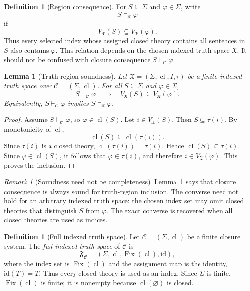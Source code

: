 \documentclass[11pt]{amsart}
\numberwithin{equation}{section}
\theoremstyle{plain}
\newtheorem{lemma}[theorem]{Lemma}
\theoremstyle{definition}
\newtheorem{definition}[theorem]{Definition}
\theoremstyle{remark}
\newtheorem{remark}[theorem]{Remark}
\newcommand{\Cl}{\operatorname{cl}}
\newcommand{\Fix}{\operatorname{Fix}}
\newcommand{\C}{\mathcal C}
\newcommand{\X}{\mathfrak X}
\newcommand{\F}{\mathfrak F}
\newcommand{\Sig}{\Sigma}
\begin{document}
\begin{definition}[Region consequence]
For \(S\subseteq\Sig\) and \(\varphi\in\Sig\), write
\[
  S\models_{\X}\varphi
\]
if
\[
  V_{\X}(S)\subseteq V_{\X}(\varphi).
\]
Thus every selected index whose assigned closed theory contains all sentences in \(S\) also contains \(\varphi\). This relation depends on the chosen indexed truth space \(\X\). It should not be confused with closure consequence \(S\vdash_{\C}\varphi\).
\end{definition}

\begin{lemma}[Truth-region soundness]
\label{lem:truth-region-soundness}
Let \(\X=(\Sig,\Cl,I,\tau)\) be a finite indexed truth space over \(\C=(\Sig,\Cl)\). For all \(S\subseteq\Sig\) and \(\varphi\in\Sig\),
\[
  S\vdash_{\C}\varphi
  \quad\Longrightarrow\quad
  V_{\X}(S)\subseteq V_{\X}(\varphi).
\]
Equivalently, \(S\vdash_{\C}\varphi\) implies \(S\models_{\X}\varphi\).
\end{lemma}

\begin{proof}
Assume \(S\vdash_{\C}\varphi\), so \(\varphi\in\Cl(S)\). Let \(i\in V_{\X}(S)\). Then \(S\subseteq\tau(i)\). By monotonicity of \(\Cl\),
\[
  \Cl(S)\subseteq\Cl(\tau(i)).
\]
Since \(\tau(i)\) is a closed theory, \(\Cl(\tau(i))=\tau(i)\). Hence \(\Cl(S)\subseteq\tau(i)\). Since \(\varphi\in\Cl(S)\), it follows that \(\varphi\in\tau(i)\), and therefore \(i\in V_{\X}(\varphi)\). This proves the inclusion.
\end{proof}

\begin{remark}[Soundness need not be completeness]
Lemma~\ref{lem:truth-region-soundness} says that closure consequence is always sound for truth-region inclusion. The converse need not hold for an arbitrary indexed truth space: the chosen index set may omit closed theories that distinguish \(S\) from \(\varphi\). The exact converse is recovered when all closed theories are used as indices.
\end{remark}

\begin{definition}[Full indexed truth space]
Let \(\C=(\Sig,\Cl)\) be a finite closure system. The \emph{full indexed truth space} of \(\C\) is
\[
  \F_{\C}=(\Sig,\Cl,\Fix(\Cl),\mathrm{id}),
\]
where the index set is \(\Fix(\Cl)\) and the assignment map is the identity, \(\mathrm{id}(T)=T\). Thus every closed theory is used as an index. Since \(\Sig\) is finite, \(\Fix(\Cl)\) is finite; it is nonempty because \(\Cl(\varnothing)\) is closed.
\end{definition}
\end{document}
